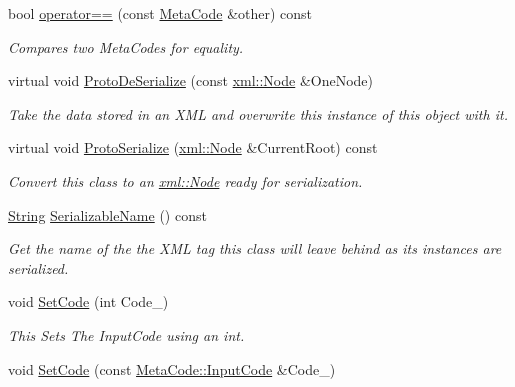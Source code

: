 \begin{DoxyCompactItemize}
bool \hyperlink{classMezzanine_1_1MetaCode_a9766ecefce7d3e8a8e379c8e19fcf414}{operator==} (const \hyperlink{classMezzanine_1_1MetaCode}{MetaCode} \&other) const 
\begin{DoxyCompactList}\small\item\em Compares two MetaCodes for equality. \item\end{DoxyCompactList}\item 
virtual void \hyperlink{classMezzanine_1_1MetaCode_a49a98adb36a3e6242b2e243927babcb8}{ProtoDeSerialize} (const \hyperlink{classMezzanine_1_1xml_1_1Node}{xml::Node} \&OneNode)
\begin{DoxyCompactList}\small\item\em Take the data stored in an XML and overwrite this instance of this object with it. \item\end{DoxyCompactList}\item 
virtual void \hyperlink{classMezzanine_1_1MetaCode_a87d4b4402a1d2b8221747b7d136b0f64}{ProtoSerialize} (\hyperlink{classMezzanine_1_1xml_1_1Node}{xml::Node} \&CurrentRoot) const 
\begin{DoxyCompactList}\small\item\em Convert this class to an \hyperlink{classMezzanine_1_1xml_1_1Node}{xml::Node} ready for serialization. \item\end{DoxyCompactList}\item 
\hyperlink{namespaceMezzanine_acf9fcc130e6ebf08e3d8491aebcf1c86}{String} \hyperlink{classMezzanine_1_1MetaCode_a50215ce2068922095f5608f17a2a3d15}{SerializableName} () const 
\begin{DoxyCompactList}\small\item\em Get the name of the the XML tag this class will leave behind as its instances are serialized. \item\end{DoxyCompactList}\item 
void \hyperlink{classMezzanine_1_1MetaCode_aeec5b1c0411d1f7851945f4da69c28e2}{SetCode} (int Code\_\-)
\begin{DoxyCompactList}\small\item\em This Sets The InputCode using an int. \item\end{DoxyCompactList}\item 
void \hyperlink{classMezzanine_1_1MetaCode_a8c5fa366af24a273ea945aaa8cc7050c}{SetCode} (const \hyperlink{classMezzanine_1_1MetaCode_a3b5633f0145bf3287cf53a3f05b5563c}{MetaCode::InputCode} \&Code\_\-)

\end{DoxyCompactItemize}
